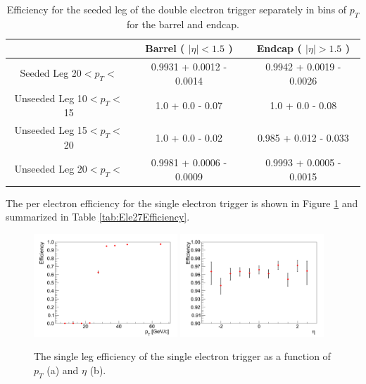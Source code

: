 \begin{table}[!ht]
\begin{center}
\begin{tabular}{c|c|c} \hline
              & Barrel ( $|\eta|<1.5$ )  & Endcap ( $|\eta|>1.5$ )  \\  \hline
\hline
Seeded Leg 20$<p_{T}<$   & 0.9931 + 0.0012 - 0.0014 & 0.9942 + 0.0019 - 0.0026 \\ \hline
Unseeded Leg 10$<p_{T}<$15 & 1.0 + 0.0 - 0.07 & 1.0 + 0.0 - 0.08                 \\ \hline
Unseeded Leg 15$<p_{T}<$20 & 1.0 + 0.0 - 0.02 & 0.985 + 0.012 - 0.033            \\ \hline
Unseeded Leg 20$<p_{T}<$   & 0.9981 + 0.0006 - 0.0009 & 0.9993 + 0.0005 - 0.0015 \\
\hline
\end{tabular}
\caption{Efficiency for the seeded leg of the double electron trigger 
separately in bins of $p_{T}$ for the barrel and endcap.
\label{tab:eff_double_ele}}
\end{center}
\end{table}

The per electron efficiency for the
single electron trigger is shown in Figure \ref{fig:Ele27Efficiency} and summarized
in Table \ref{tab:Ele27Efficiency}. 

\begin{figure}[!ht]
\begin{center}
\includegraphics[width=0.48\textwidth]{figures/ElectronTriggerEffVsPt_Ele27Tight.pdf}
\includegraphics[width=0.48\textwidth]{figures/ElectronTriggerEffVsEta_Ele27Tight.pdf}
\end{center}
\caption{The single leg efficiency of the single electron trigger as a function of $p_{T}$ (a) and $\eta$ (b).}
\label{fig:Ele27Efficiency}
\end{figure}

